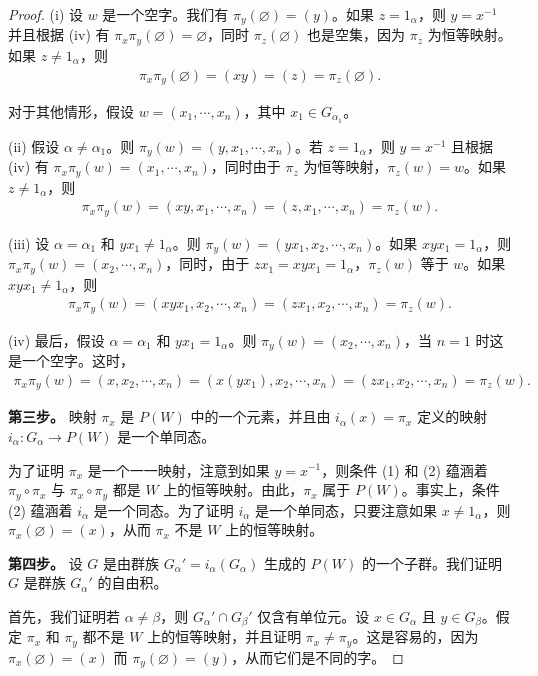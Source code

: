 \documentclass[../../main.tex]{subfiles}
\begin{document}
\begin{proof}
(i) 设 $w$ 是一个空字。我们有 $\pi_y(\varnothing)=(y)$。如果 $z=1_\alpha$，则 $y=x^{-1}$ 并且根据 (iv) 有 $\pi_x\pi_y(\varnothing)=\varnothing$，同时 $\pi_z(\varnothing)$ 也是空集，因为 $\pi_z$ 为恒等映射。如果 $z\neq 1_\alpha$，则
\begin{align*}
\pi_x\pi_y(\varnothing)=(xy)=(z)=\pi_z(\varnothing).
\end{align*}

对于其他情形，假设 $w=(x_1,\cdots,x_n)$，其中 $x_1\in G_{\alpha_1}$。

(ii) 假设 $\alpha\neq\alpha_1$。则 $\pi_y(w)=(y,x_1,\cdots,x_n)$。若 $z=1_\alpha$，则 $y=x^{-1}$ 且根据 (iv) 有 $\pi_x\pi_y(w)=(x_1,\cdots,x_n)$，同时由于 $\pi_z$ 为恒等映射，$\pi_z(w)=w$。如果 $z\neq 1_\alpha$，则
\begin{align*}
\pi_x\pi_y(w)=(xy,x_1,\cdots,x_n)=(z,x_1,\cdots,x_n)=\pi_z(w).
\end{align*}

(iii) 设 $\alpha=\alpha_1$ 和 $yx_1\neq 1_\alpha$。则 $\pi_y(w)=(yx_1,x_2,\cdots,x_n)$。如果 $xyx_1=1_\alpha$，则 $\pi_x\pi_y(w)=(x_2,\cdots,x_n)$，同时，由于 $zx_1=xyx_1=1_\alpha$，$\pi_z(w)$ 等于 $w$。如果 $xyx_1\neq 1_\alpha$，则
\begin{align*}
\pi_x\pi_y(w)=(xyx_1,x_2,\cdots,x_n)=(zx_1,x_2,\cdots,x_n)=\pi_z(w).
\end{align*}

(iv) 最后，假设 $\alpha=\alpha_1$ 和 $yx_1=1_\alpha$。则 $\pi_y(w)=(x_2,\cdots,x_n)$，当 $n=1$ 时这是一个空字。这时，
\begin{align*}
\pi_x\pi_y(w)=(x,x_2,\cdots,x_n)=(x(yx_1),x_2,\cdots,x_n)=(zx_1,x_2,\cdots,x_n)=\pi_z(w).
\end{align*}

\textbf{第三步。} 映射 $\pi_x$ 是 $P(W)$ 中的一个元素，并且由 $i_\alpha(x)=\pi_x$ 定义的映射 $i_\alpha:G_\alpha\to P(W)$ 是一个单同态。

为了证明 $\pi_x$ 是一个一一映射，注意到如果 $y=x^{-1}$，则条件 (1) 和 (2) 蕴涵着 $\pi_y\circ\pi_x$ 与 $\pi_x\circ\pi_y$ 都是 $W$ 上的恒等映射。由此，$\pi_x$ 属于 $P(W)$。事实上，条件 (2) 蕴涵着 $i_\alpha$ 是一个同态。为了证明 $i_\alpha$ 是一个单同态，只要注意如果 $x\neq 1_\alpha$，则 $\pi_x(\varnothing)=(x)$，从而 $\pi_x$ 不是 $W$ 上的恒等映射。

\textbf{第四步。} 设 $G$ 是由群族 $G_\alpha'=i_\alpha(G_\alpha)$ 生成的 $P(W)$ 的一个子群。我们证明 $G$ 是群族 $G_\alpha'$ 的自由积。

首先，我们证明若 $\alpha\neq\beta$，则 $G_\alpha'\cap G_\beta'$ 仅含有单位元。设 $x\in G_\alpha$ 且 $y\in G_\beta$。假定 $\pi_x$ 和 $\pi_y$ 都不是 $W$ 上的恒等映射，并且证明 $\pi_x\neq\pi_y$。这是容易的，因为 $\pi_x(\varnothing)=(x)$ 而 $\pi_y(\varnothing)=(y)$，从而它们是不同的字。


\end{proof}
\end{document}
